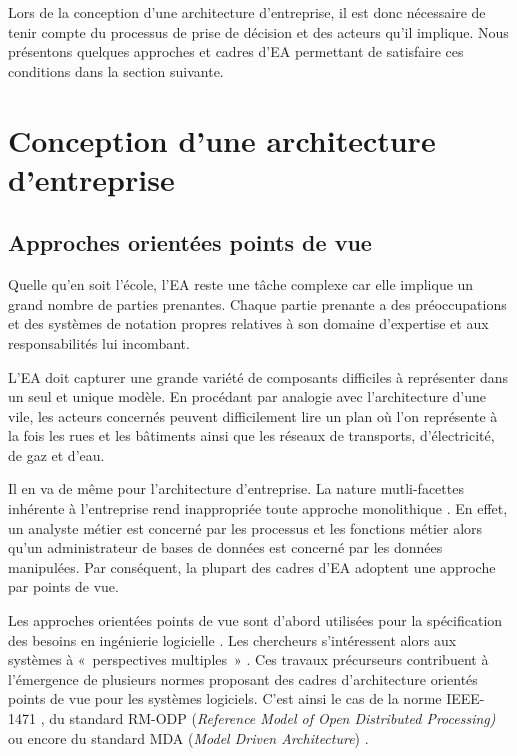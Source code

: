 Lors de la conception d'une architecture d'entreprise, il est donc nécessaire de tenir compte du processus de prise de décision et des acteurs qu'il implique. Nous présentons quelques approches et cadres d'EA permettant de satisfaire ces conditions dans la section suivante.

\section{Conception d'une architecture d'entreprise}

	\subsection{Approches orientées points de vue}

Quelle qu'en soit l'école, l'EA reste une tâche complexe \cite{steen2004supporting} car elle implique un grand nombre de parties prenantes. Chaque partie prenante a des préoccupations et des systèmes de notation propres relatives à son domaine d'expertise et aux responsabilités lui incombant.

L'EA doit capturer une grande variété de composants difficiles à représenter dans un seul et unique modèle. En procédant par analogie avec l'architecture d'une vile, les acteurs concernés peuvent difficilement lire un plan où l'on représente à la fois les rues et les bâtiments ainsi que les réseaux de transports, d'électricité, de gaz et d'eau.  

Il en va de même pour l'architecture d'entreprise. La nature mutli-facettes inhérente à l'entreprise rend inappropriée toute approche monolithique \cite{armour1999bigpicture}. En effet, un analyste métier est concerné par les processus et les fonctions métier alors qu'un administrateur de bases de données est concerné par les données manipulées. Par conséquent, la plupart des cadres d'EA adoptent une approche par points de vue.

Les approches orientées points de vue sont d'abord utilisées pour la 
spécification des besoins en ingénierie logicielle \cite{mullery1979core}. Les 
chercheurs s'intéressent alors aux systèmes à «~perspectives multiples~» 
\cite{finkelstein1992viewpoints} \cite{kotonya1996requirements} 
\cite{nuseibeh1994multi} \cite{meyers1993representing}. Ces travaux précurseurs contribuent à l'émergence de plusieurs normes proposant des cadres d'architecture orientés points de vue pour les systèmes logiciels. C'est ainsi le cas de la norme IEEE-1471 \cite{hilliard2000ieee}, du standard RM-ODP (\textit{Reference Model of Open Distributed Processing)} \cite{raymond1995reference} ou encore du standard MDA (\textit{Model Driven Architecture}) \cite{kleppe2003mda}.

